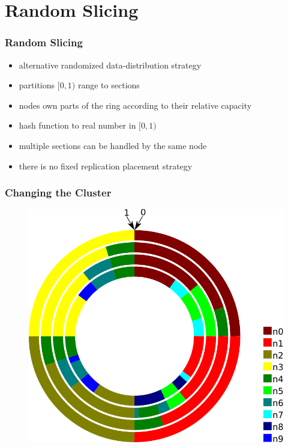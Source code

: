 \documentclass[aspectratio=169]{beamer}
\begin{document}
\section{Random Slicing}
\begin{frame}
\frametitle{Random Slicing}
\begin{itemize}
\item alternative randomized data-distribution strategy
\item partitions $[0,1)$ range to sections
\item nodes own parts of the ring according to their relative capacity
\item hash function to real number in $[0,1)$
\item multiple sections can be handled by the same node
\item there is no fixed replication placement strategy
\end{itemize}
\end{frame}

\begin{frame}
\frametitle{Changing the Cluster}
\begin{figure}
\includegraphics[height=0.8\textheight]{random_slicing_example}
\end{figure}
\end{frame}
\end{document}
